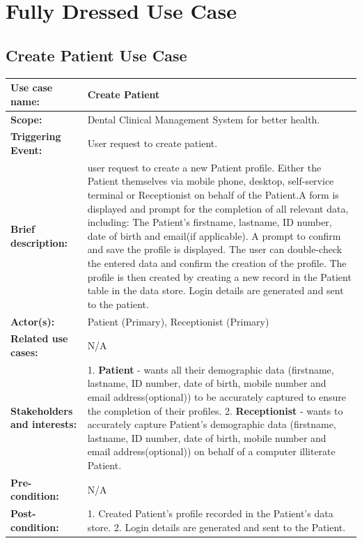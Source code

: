 \documentclass[11 pt]{article}
\begin{document}
\section{Fully Dressed Use Case}

\subsection{Create Patient Use Case}

\begin{tabular}{|p{3cm}|p{9cm}|}
\hline
\textbf{Use case name:}& Create Patient\\
\hline
\textbf{Scope:}& Dental Clinical Management System for better health.\\
\hline
\textbf{Triggering Event:}& User request to create patient.\\
\hline
\textbf{Brief description:}& user request to create a new Patient profile. Either the Patient themselves via mobile phone, desktop, self-service terminal or Receptionist on behalf of the Patient.A form is displayed and prompt for the completion of all relevant data, including: The Patient's firstname, lastname, ID number, date of birth and email(if applicable). A prompt to confirm and save the profile is displayed. The user can double-check the entered data and confirm the creation of the profile. The profile is then created by creating a new record in the Patient table in the data store. Login details are generated and sent to the patient.\\
\hline
\textbf{Actor(s):}& Patient (Primary), Receptionist (Primary)\\
\hline
\textbf{Related use cases:}& N/A\\
\hline
\textbf{Stakeholders and interests:}& 1. \textbf{Patient} - wants all their demographic data (firstname, lastname, ID number, date of birth, mobile number and email address(optional)) to be accurately captured to ensure the completion of their profiles. 2. \textbf{Receptionist} - wants to accurately capture Patient's demographic data (firstname, lastname, ID number, date of birth, mobile number and email address(optional)) on behalf of a computer illiterate Patient.\\
\hline
\textbf{Pre-condition:}& N/A\\
\hline
\textbf{Post-condition:}& 1. Created Patient's profile recorded in the Patient's data store.  2. Login details are generated and sent to the Patient.\\
\hline
\end{tabular}
\end{document}
